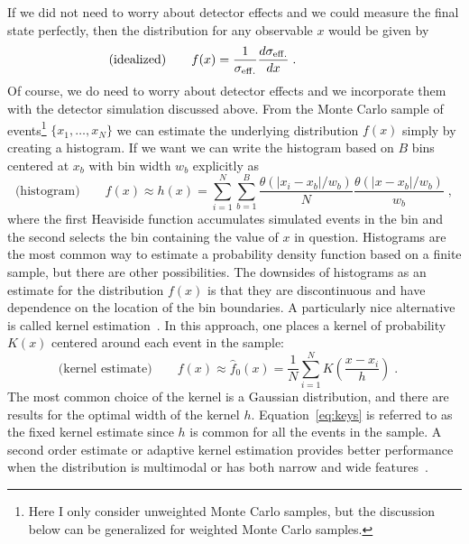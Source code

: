 If we did not need to worry about detector effects and we could measure the final state perfectly, then the distribution for any observable $x$ would be given by
\begin{equation}
\textrm{(idealized)}\hspace{2em}f(x) = \frac{1}{\sigma_{\rm eff.}} \frac{d\sigma_{\rm eff.}}{dx}\;.\hspace{5em}
\end{equation}
Of course, we do need to worry about detector effects and we incorporate them with the detector simulation discussed above.  From the Monte Carlo sample of events\footnote{Here I only consider unweighted Monte Carlo samples, but the discussion below can be generalized for weighted Monte Carlo samples.} $\{x_1, \dots, x_N\}$ we can estimate the underlying distribution $f(x)$ simply by creating a histogram.  If we want we can write the histogram based on $B$ bins centered at $x_b$ with bin width $w_b$ explicitly as
\begin{equation}
\textrm{(histogram)} \hspace{2em}f(x) \approx h(x) =  \sum_{i=1}^N \sum_{b=1}^B  \frac{ \theta(|x_i-x_b|/w_b) }{N} \frac{\theta(|x -x_b|/w_b)}{w_b}\;,  \end{equation}
where the first Heaviside function accumulates simulated events in the bin and the second selects the bin containing the value of $x$ in question.  Histograms are the most common way to estimate a probability density function based on a finite sample, but there are other possibilities.  The downsides of histograms as an estimate for the distribution $f(x)$ is that they are discontinuous and have dependence on the location of the bin boundaries.  A particularly nice alternative is called kernel estimation~\cite{Cranmer:2000du}.  In this approach, one places a kernel of probability $K(x)$ centered around each event in the sample:
\begin{equation}
\textrm{(kernel estimate)}\hspace{2em}f(x) \approx \hat{f}_0(x) =  \frac{1}{N} \sum_{i=1}^N K\left( \frac{x-x_i}{h} \right)\;.\hspace{1em}
\end{equation}
The most common choice of the kernel is a Gaussian distribution, and there are results for the optimal width of the kernel $h$.  Equation~\ref{eq:keys} is referred to as the fixed kernel estimate since $h$ is common for all the events in the sample.  A second order estimate or adaptive kernel estimation provides better performance when the distribution is multimodal or has both narrow and wide features~\cite{Cranmer:2000du}.


